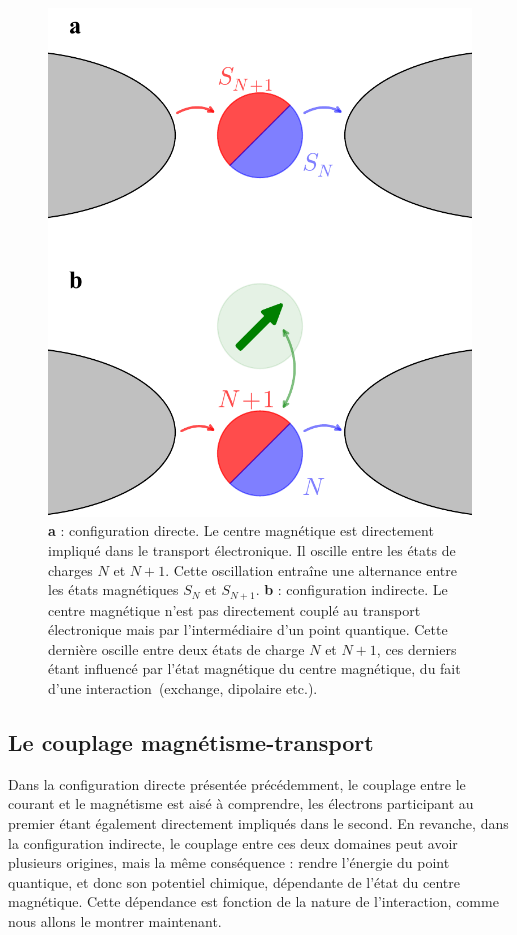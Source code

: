 \begin{figure}
\parbox{6.5cm}{
\centering \includegraphics[scale=0.45]{Resultats/DirVsInd/DirVsInd.pdf} 
}
\parbox{7.5cm}{
\caption{\textbf{a} : configuration directe. Le centre magnétique est directement impliqué dans le transport électronique. Il oscille entre les états de charges $N$ et $N+1$. Cette oscillation entraîne une alternance entre les états magnétiques $S_{N}$ et $S_{N+1}$. \textbf{b} : configuration indirecte. Le centre magnétique n'est pas directement couplé au transport électronique mais par l'intermédiaire d'un point quantique. Cette dernière oscille entre deux états de charge $N$ et $N+1$, ces derniers étant influencé par l'état magnétique du centre magnétique, du fait d'une interaction~(exchange, dipolaire etc.).}
\label{DirVsInd}
}
\end{figure}


\subsection{Le couplage magnétisme-transport}
Dans la configuration directe présentée précédemment, le couplage entre le courant et le magnétisme est aisé à comprendre, les électrons participant au premier étant également directement impliqués dans le second. En revanche, dans la configuration indirecte, le couplage entre ces deux domaines peut avoir plusieurs origines, mais la m\^eme conséquence : rendre l'énergie du point quantique, et donc son potentiel chimique, dépendante de l'état du centre magnétique. Cette dépendance est fonction de la nature de l'interaction, comme nous allons le montrer maintenant.

